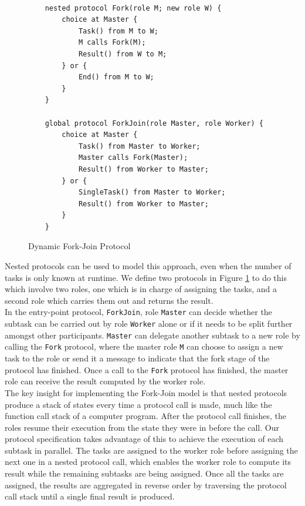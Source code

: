 \documentclass[12pt,twoside]{report}
\begin{document}
\begin{figure}[htb!]
    \centering
    \lstset{language=Scribble}
    \begin{lstlisting}
    
    nested protocol Fork(role M; new role W) {
        choice at Master {
            Task() from M to W;
            M calls Fork(M);
            Result() from W to M;
        } or {
            End() from M to W;
        }
    }
    
    global protocol ForkJoin(role Master, role Worker) {
        choice at Master {
            Task() from Master to Worker;
            Master calls Fork(Master);
            Result() from Worker to Master;
        } or {
            SingleTask() from Master to Worker;
            Result() from Worker to Master;
        }
    }
    \end{lstlisting}
    \caption{Dynamic Fork-Join Protocol}
    \label{fork-join-protocol}
\end{figure}{}

Nested protocols can be used to model this approach, even when the number of tasks is only known at runtime. We define two protocols in Figure \ref{fork-join-protocol} to do this which involve two roles, one which is in charge of assigning the tasks, and a second role which carries them out and returns the result.\\

In the entry-point protocol, \texttt{ForkJoin}, role \texttt{Master} can decide whether the subtask can be carried out by role \texttt{Worker} alone or if it needs to be split further amongst other participants. \texttt{Master} can delegate another subtask to a new role by calling the \texttt{Fork} protocol, where the master role \texttt{M} can choose to assign a new task to the role or send it a message to indicate that the fork stage of the protocol has finished. Once a call to the \texttt{Fork} protocol has finished, the master role can receive the result computed by the worker role.\\

The key insight for implementing the Fork-Join model is that nested protocols produce a stack of states every time a protocol call is made, much like the function call stack of a computer program. After the protocol call finishes, the roles resume their execution from the state they were in before the call. Our protocol specification takes advantage of this to achieve the execution of each subtask in parallel. The tasks are assigned to the worker role before assigning the next one in a nested protocol call, which enables the worker role to compute its result while the remaining subtasks are being assigned. Once all the tasks are assigned, the results are aggregated in reverse order by traversing the protocol call stack until a single final result is produced.\\
\end{document}
